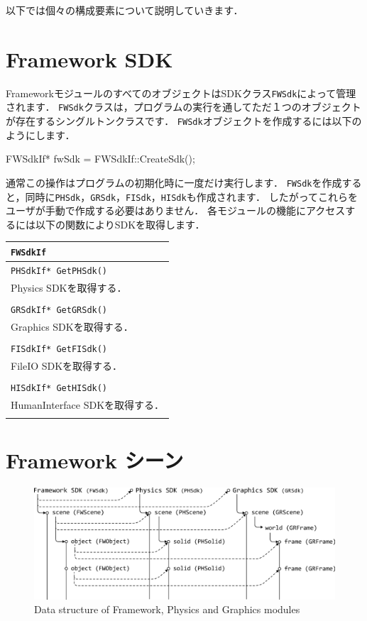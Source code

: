 \KLUDGE 以下では個々の構成要素について説明していきます．


\section{Framework SDK}

FrameworkモジュールのすべてのオブジェクトはSDKクラス\texttt{FWSdk}によって管理されます．
\texttt{FWSdk}クラスは，プログラムの実行を通してただ１つのオブジェクトが存在するシングルトンクラスです．
\texttt{FWSdk}オブジェクトを作成するには以下のようにします．
\begin{sourcecode}
FWSdkIf* fwSdk = FWSdkIf::CreateSdk();
\end{sourcecode}
\KLUDGE 通常この操作はプログラムの初期化時に一度だけ実行します．
\texttt{FWSdk}を作成すると，同時に\texttt{PHSdk}，\texttt{GRSdk}，\texttt{FISdk}，\texttt{HISdk}も作成されます．
\KLUDGE したがってこれらをユーザが手動で作成する必要はありません．
\KLUDGE 各モジュールの機能にアクセスするには以下の関数によりSDKを取得します．

\noindent
\begin{tabular}{p{1.0\hsize}}
\\
\texttt{FWSdkIf}				\\ \midrule
\texttt{PHSdkIf* GetPHSdk()}	\\
Physics SDKを取得する．			\\
\\
\texttt{GRSdkIf* GetGRSdk()}	\\
Graphics SDKを取得する．		\\
\\
\texttt{FISdkIf* GetFISdk()}	\\
FileIO SDKを取得する．			\\
\\
\texttt{HISdkIf* GetHISdk()}	\\
HumanInterface SDKを取得する．	\\
\\
\end{tabular}

\section{Framework シーン}

\begin{figure}[t]
\begin{center}
\includegraphics[width=.9\hsize]{fig/fwscene.eps}
\end{center}
\caption{Data structure of Framework, Physics and Graphics modules}
\label{fig_fwscene}
\end{figure}

